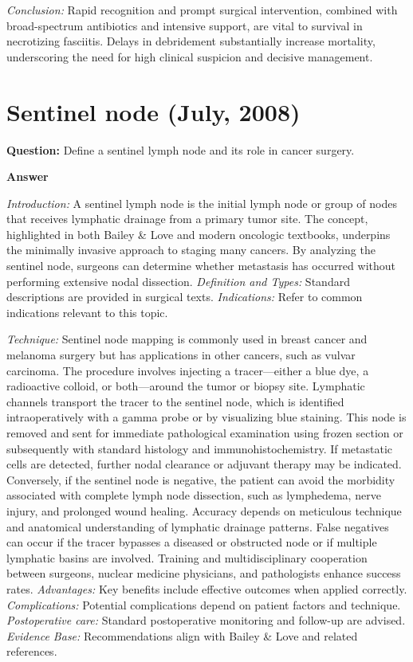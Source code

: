 \documentclass{article}
\begin{document}
\emph{Conclusion:} Rapid recognition and prompt surgical intervention, combined with broad-spectrum antibiotics and intensive support, are vital to survival in necrotizing fasciitis. Delays in debridement substantially increase mortality, underscoring the need for high clinical suspicion and decisive management.


\section{Sentinel node (July, 2008)}

\textbf{Question:} Define a sentinel lymph node and its role in cancer surgery.

\textbf{Answer}

\emph{Introduction:} A sentinel lymph node is the initial lymph node or group of nodes that receives lymphatic drainage from a primary tumor site. The concept, highlighted in both Bailey \& Love and modern oncologic textbooks, underpins the minimally invasive approach to staging many cancers. By analyzing the sentinel node, surgeons can determine whether metastasis has occurred without performing extensive nodal dissection.
\emph{Definition and Types:} Standard descriptions are provided in surgical texts.
\emph{Indications:} Refer to common indications relevant to this topic.

\emph{Technique:} Sentinel node mapping is commonly used in breast cancer and melanoma surgery but has applications in other cancers, such as vulvar carcinoma. The procedure involves injecting a tracer—either a blue dye, a radioactive colloid, or both—around the tumor or biopsy site. Lymphatic channels transport the tracer to the sentinel node, which is identified intraoperatively with a gamma probe or by visualizing blue staining. This node is removed and sent for immediate pathological examination using frozen section or subsequently with standard histology and immunohistochemistry. If metastatic cells are detected, further nodal clearance or adjuvant therapy may be indicated. Conversely, if the sentinel node is negative, the patient can avoid the morbidity associated with complete lymph node dissection, such as lymphedema, nerve injury, and prolonged wound healing. Accuracy depends on meticulous technique and anatomical understanding of lymphatic drainage patterns. False negatives can occur if the tracer bypasses a diseased or obstructed node or if multiple lymphatic basins are involved. Training and multidisciplinary cooperation between surgeons, nuclear medicine physicians, and pathologists enhance success rates.
\emph{Advantages:} Key benefits include effective outcomes when applied correctly.
\emph{Complications:} Potential complications depend on patient factors and technique.
\emph{Postoperative care:} Standard postoperative monitoring and follow-up are advised.
\emph{Evidence Base:} Recommendations align with Bailey \& Love and related references.
\end{document}
